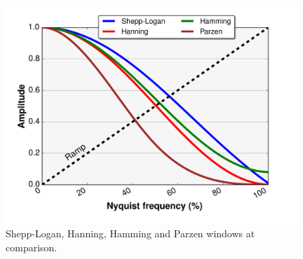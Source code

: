 {\begin{figure}[!h]
    \centering
    \includegraphics[width=11cm]{images/introduction_fbp_filter_function_fourier_space.png}   
   \caption[Low-pass windows that can be superimposed to the ramp filter.]{Shepp-Logan, Hanning, Hamming and Parzen windows at comparison.}
    \label{introduction:fbp:filter-function-fourier-space}
\end{figure}


}
